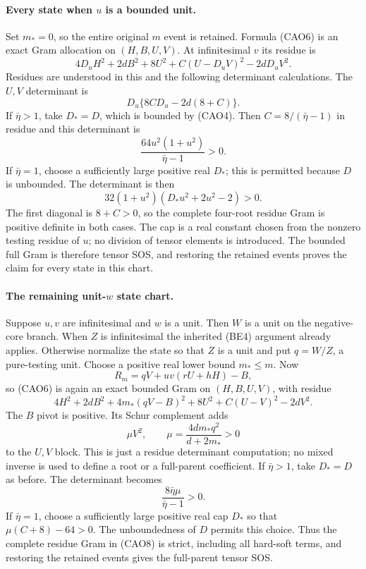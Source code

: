 \paragraph{Every state when $u$ is a bounded unit.}
Set $m_*=0$, so the entire original $m$ event is retained. Formula
(CAO6) is an exact Gram allocation on $(H,B,U,V)$. At infinitesimal
$v$ its residue is
\[
 4D_uH^2+2dB^2+8U^2+C(U-D_uV)^2-2dD_uV^2.
 \tag{CAO7}
\]
Residues are understood in this and the following determinant
calculations. The $U,V$ determinant is
\[
 D_u\{8CD_u-2d(8+C)\}.
\]
If $\bar\eta>1$, take $D_*=D$, which is bounded by (CAO4).
Then $C=8/(\bar\eta-1)$ in residue and this determinant is
\[
 \frac{64u^2(1+u^2)}{\bar\eta-1}>0.
\]
If $\bar\eta=1$, choose a sufficiently large positive real $D_*$;
this is permitted because $D$ is unbounded. The determinant is then
\[
 32(1+u^2)(D_*u^2+2u^2-2)>0.
\]
The first diagonal is $8+C>0$, so the complete four-root residue
Gram is positive definite in both cases. The cap is a real constant
chosen from the nonzero testing residue of $u$; no division of tensor
elements is introduced. The bounded full Gram is therefore tensor
SOS, and restoring the retained events proves the claim for every
state in this chart.

\paragraph{The remaining unit-$w$ state chart.}
Suppose $u,v$ are infinitesimal and $w$ is a unit. Then $W$ is a unit
on the negative-core branch. When $Z$ is infinitesimal the inherited
(BE4) argument already applies. Otherwise normalize the state so that
$Z$ is a unit and put $q=W/Z$, a pure-testing unit. Choose a positive
real lower bound $m_*\le m$. Now
\[
 R_m=qV+uv(rU+hH)-B,
\]
so (CAO6) is again an exact bounded Gram on $(H,B,U,V)$, with residue
\[
 4H^2+2dB^2+4m_*(qV-B)^2
       +8U^2+C(U-V)^2-2dV^2.                    \tag{CAO8}
\]
The $B$ pivot is positive. Its Schur complement adds
\[
 \mu V^2,\qquad \mu=\frac{4dm_*q^2}{d+2m_*}>0
\]
to the $U,V$ block. This is just a residue determinant computation;
no mixed inverse is used to define a root or a full-parent coefficient.
If $\bar\eta>1$, take $D_*=D$ as before. The determinant becomes
\[
 \frac{8\bar\eta\mu}{\bar\eta-1}>0.
\]
If $\bar\eta=1$, choose a sufficiently large positive real cap
$D_*$ so that $\mu(C+8)-64>0$. The unboundedness of $D$ permits this
choice. Thus the complete residue Gram in (CAO8) is strict, including
all hard-soft terms, and restoring the retained events gives the
full-parent tensor SOS.


